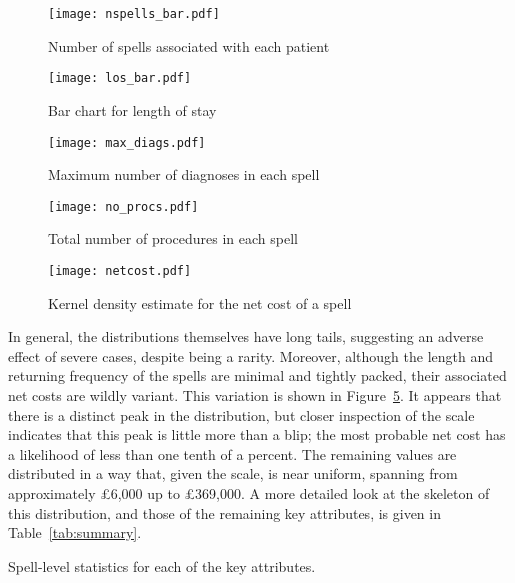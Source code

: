 \begin{figure}
    \centering
    \texttt{[image: nspells\_bar.pdf]}
    \caption{Number of spells associated with each patient}%
    \label{fig:no_spells}
\end{figure}

\begin{figure}
    \centering
    \texttt{[image: los\_bar.pdf]}
    \caption{Bar chart for length of stay}%
    \label{fig:los}
\end{figure}

\begin{figure}
    \centering
    \texttt{[image: max\_diags.pdf]}
    \caption{Maximum number of diagnoses in each spell}%
    \label{fig:no_diag}
\end{figure}

\begin{figure}
    \centering
    \texttt{[image: no\_procs.pdf]}
    \caption{Total number of procedures in each spell}%
    \label{fig:no_proc}
\end{figure}

\begin{figure}
    \centering
    \texttt{[image: netcost.pdf]}
    \caption{Kernel density estimate for the net cost of a spell}%
    \label{fig:netcost}
\end{figure}

In general, the distributions themselves have long tails, suggesting an adverse
effect of severe cases, despite being a rarity. Moreover, although the length
and returning frequency of the spells are minimal and tightly packed, their
associated net costs are wildly variant. This variation is shown in
Figure~\ref{fig:netcost}. It appears that there is a distinct peak in the
distribution, but closer inspection of the scale indicates that this peak is
little more than a blip; the most probable net cost has a likelihood of less
than one tenth of a percent. The remaining values are distributed in a way that,
given the scale, is near uniform, spanning from approximately \pounds6,000 up to
\pounds369,000. A more detailed look at the skeleton of this distribution, and
those of the remaining key attributes, is given in Table~\ref{tab:summary}.

\begin{table}
    \centering
    \resizebox{\textwidth}{!}{%
        
    }
    \caption{Spell-level statistics for each of the key attributes.}%
    \label{tab:summary}
\end{table}

